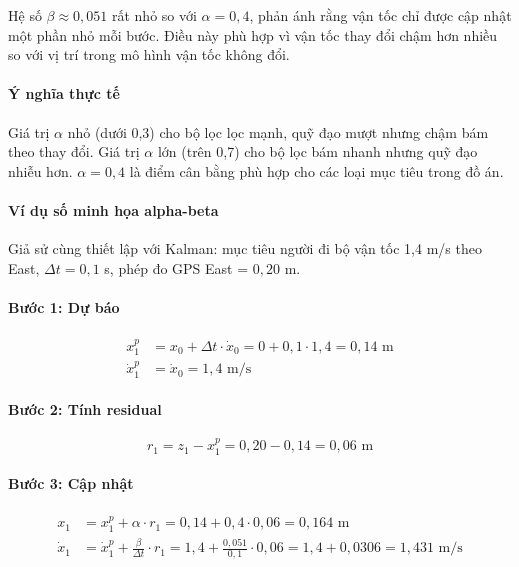Hệ số $\beta \approx 0{,}051$ rất nhỏ so với $\alpha = 0{,}4$, phản ánh rằng vận tốc chỉ được cập nhật một phần nhỏ mỗi bước. Điều này phù hợp vì vận tốc thay đổi chậm hơn nhiều so với vị trí trong mô hình vận tốc không đổi.

\paragraph{Ý nghĩa thực tế\\} Giá trị $\alpha$ nhỏ (dưới 0,3) cho bộ lọc lọc mạnh, quỹ đạo mượt nhưng chậm bám theo thay đổi. Giá trị $\alpha$ lớn (trên 0,7) cho bộ lọc bám nhanh nhưng quỹ đạo nhiễu hơn. $\alpha = 0{,}4$ là điểm cân bằng phù hợp cho các loại mục tiêu trong đồ án.

\paragraph{Ví dụ số minh họa alpha-beta\\} Giả sử cùng thiết lập với Kalman: mục tiêu người đi bộ vận tốc 1,4 m/s theo East, $\Delta t = 0{,}1$ s, phép đo GPS East = $0{,}20$ m.

\paragraph{Bước 1: Dự báo\\}
\begin{align*}
    x_1^p &= x_0 + \Delta t \cdot \dot{x}_0 = 0 + 0{,}1 \cdot 1{,}4 = 0{,}14 \text{ m} \\
    \dot{x}_1^p &= \dot{x}_0 = 1{,}4 \text{ m/s}
\end{align*}

\paragraph{Bước 2: Tính residual\\}
\begin{equation}
    r_1 = z_1 - x_1^p = 0{,}20 - 0{,}14 = 0{,}06 \text{ m}
\end{equation}

\paragraph{Bước 3: Cập nhật\\}
\begin{align*}
    x_1 &= x_1^p + \alpha \cdot r_1 = 0{,}14 + 0{,}4 \cdot 0{,}06 = 0{,}164 \text{ m} \\
    \dot{x}_1 &= \dot{x}_1^p + \frac{\beta}{\Delta t} \cdot r_1 = 1{,}4 + \frac{0{,}051}{0{,}1} \cdot 0{,}06 = 1{,}4 + 0{,}0306 = 1{,}431 \text{ m/s}
\end{align*}

